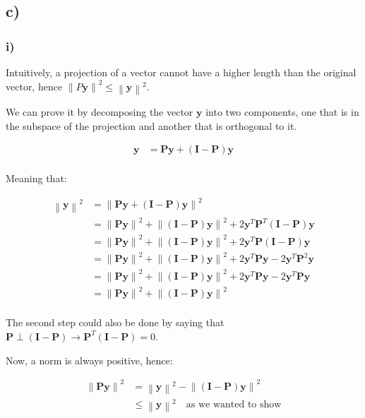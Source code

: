 \documentclass[12pt,a4paper,oneside]{paper}
\begin{document}
\newpage
\subsection*{c)}

\subsubsection*{i)}

Intuitively, a projection of a vector cannot have a higher length than the original vector, hence $\left\| P \bm{y} \right\|^2 \leq \left\| \bm{y} \right\|^2$.

We can prove it by decomposing the vector $\bm{y}$ into two components, one that is in the subspace of the projection and another that is orthogonal to it.

\begin{align*}
    \bm{y} &= \bm{P} \bm{y} + (\bm{I} - \bm{P}) \bm{y} \\
\end{align*}

Meaning that:

\begin{align*}
    \left\| \bm{y} \right\|^2 &= \left\| \bm{P} \bm{y} + (\bm{I} - \bm{P}) \bm{y} \right\|^2 \\
    &= \left\| \bm{P} \bm{y} \right\|^2 + \left\| (\bm{I} - \bm{P}) \bm{y} \right\|^2 + 2 \bm{y}^T \bm{P}^T (\bm{I} - \bm{P}) \bm{y} \\
    &= \left\| \bm{P} \bm{y} \right\|^2 + \left\| (\bm{I} - \bm{P}) \bm{y} \right\|^2 + 2 \bm{y}^T \bm{P} (\bm{I} - \bm{P}) \bm{y} \\
    &= \left\| \bm{P} \bm{y} \right\|^2 + \left\| (\bm{I} - \bm{P}) \bm{y} \right\|^2 + 2 \bm{y}^T \bm{P} \bm{y} - 2 \bm{y}^T \bm{P}^2 \bm{y} \\
    &= \left\| \bm{P} \bm{y} \right\|^2 + \left\| (\bm{I} - \bm{P}) \bm{y} \right\|^2 + 2 \bm{y}^T \bm{P} \bm{y} - 2 \bm{y}^T \bm{P} \bm{y} \\
    &= \left\| \bm{P} \bm{y} \right\|^2 + \left\| (\bm{I} - \bm{P}) \bm{y} \right\|^2 \\
\end{align*}

The second step could also be done by saying that $\bm{P} \perp (\bm{I} - \bm{P}) \rightarrow \bm{P}^T (\bm{I} - \bm{P}) = 0$.

Now, a norm is always positive, hence:

\begin{align*}
\left\| \bm{P} \bm{y} \right\|^2 &= \left\| \bm{y} \right\|^2 - \left\| (\bm{I} - \bm{P}) \bm{y} \right\|^2 \\
&\leq \left\| \bm{y} \right\|^2 \quad \text{as we wanted to show}
\end{align*}
\end{document}
